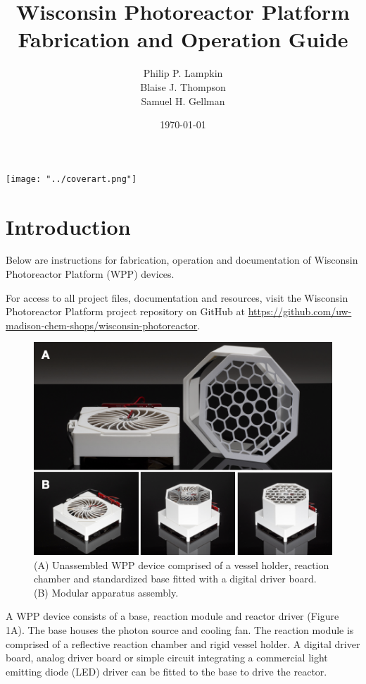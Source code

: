 \documentclass[11pt]{article}
\title{Wisconsin Photoreactor Platform\\Fabrication and Operation Guide}
\author{
  Philip P. Lampkin \\
  Blaise J. Thompson \\
  Samuel H. Gellman
  }
\date{\today}
\let\stdsection\section
\renewcommand\section{\clearpage\stdsection}
\begin{document}
\maketitle

\texttt{[image: "../coverart.png"]}

\tableofcontents

\section{Introduction}

Below are instructions for fabrication, operation and documentation of Wisconsin Photoreactor Platform (WPP) devices.

For access to all project files, documentation and resources, visit the Wisconsin Photoreactor Platform project repository on GitHub at \href{https://github.com/uw-madison-chem-shops/wisconsin-photoreactor}{https://github.com/uw-madison-chem-shops/wisconsin-photoreactor}.

\begin{figure}[H]
	\includegraphics[width=\textwidth]{"./fig1.png"}
	\caption{(A) Unassembled WPP device comprised of a vessel holder, reaction chamber and standardized base fitted with a digital driver board. (B) Modular apparatus assembly.}
\end{figure}
A WPP device consists of a base, reaction module and reactor driver (Figure 1A).
The base houses the photon source and cooling fan.
The reaction module is comprised of a reflective reaction chamber and rigid vessel holder.
A digital driver board, analog driver board or simple circuit integrating a commercial light emitting diode (LED) driver can be fitted to the base to drive the reactor.
\end{document}
